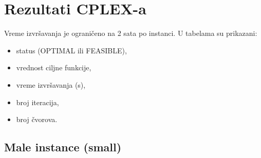 \documentclass[12pt,a4paper]{article}
\begin{document}
\section{Rezultati CPLEX-a}

Vreme izvršavanja je ograničeno na 2 sata po instanci.
U tabelama su prikazani:
\begin{itemize}
    \item status (OPTIMAL ili FEASIBLE),
    \item vrednost ciljne funkcije,
    \item vreme izvršavanja (s),
    \item broj iteracija,
    \item broj čvorova.
\end{itemize}

\subsection{Male instance (small)}
\end{document}
